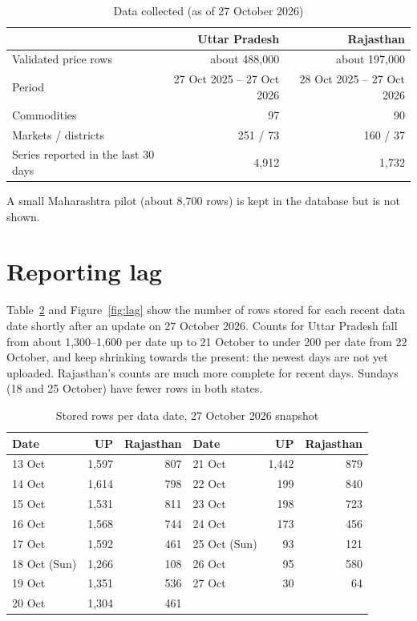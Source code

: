 \documentclass[12pt,a4paper,oneside]{report}
\numberwithin{equation}{chapter}
\numberwithin{figure}{chapter}
\numberwithin{table}{chapter}
\theoremstyle{definition}
\begin{document}
\begin{table}[H]
\centering
\caption{Data collected (as of 27 October 2026)}
\label{tab:data}
\small
\begin{tabular}{@{}lrr@{}}
\toprule
& Uttar Pradesh & Rajasthan \\
\midrule
Validated price rows & about 488{,}000 & about 197{,}000 \\
Period & 27 Oct 2025 -- 27 Oct 2026 & 28 Oct 2025 -- 27 Oct 2026 \\
Commodities & 97 & 90 \\
Markets / districts & 251 / 73 & 160 / 37 \\
Series reported in the last 30 days & 4{,}912 & 1{,}732 \\
\bottomrule
\end{tabular}
\end{table}
A small Maharashtra pilot (about 8{,}700 rows) is kept in the database but is not shown.

\section{Reporting lag}
Table~\ref{tab:lag} and Figure~\ref{fig:lag} show the number of rows stored for each recent data date shortly after an update on 27 October 2026. Counts for Uttar Pradesh fall from about 1,300--1,600 per date up to 21 October to under 200 per date from 22 October, and keep shrinking towards the present: the newest days are not yet uploaded. Rajasthan's counts are much more complete for recent days. Sundays (18 and 25 October) have fewer rows in both states.

\begin{table}[H]
\centering
\caption{Stored rows per data date, 27 October 2026 snapshot}
\label{tab:lag}
\small
\begin{tabular}{@{}lrrlrr@{}}
\toprule
Date & UP & Rajasthan & Date & UP & Rajasthan \\
\midrule
13 Oct & 1{,}597 & 807 & 21 Oct & 1{,}442 & 879 \\
14 Oct & 1{,}614 & 798 & 22 Oct & 199 & 840 \\
15 Oct & 1{,}531 & 811 & 23 Oct & 198 & 723 \\
16 Oct & 1{,}568 & 744 & 24 Oct & 173 & 456 \\
17 Oct & 1{,}592 & 461 & 25 Oct (Sun) & 93 & 121 \\
18 Oct (Sun) & 1{,}266 & 108 & 26 Oct & 95 & 580 \\
19 Oct & 1{,}351 & 536 & 27 Oct & 30 & 64 \\
20 Oct & 1{,}304 & 461 & & & \\
\bottomrule
\end{tabular}
\end{table}
\end{document}
